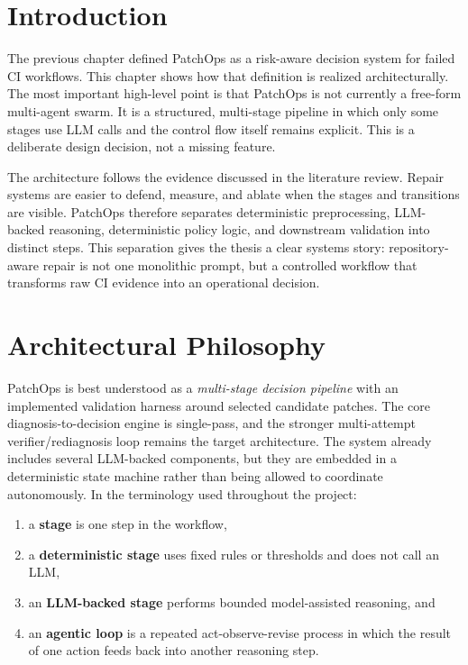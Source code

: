 \section{Introduction}

The previous chapter defined PatchOps as a risk-aware decision system for failed CI workflows. This chapter
shows how that definition is realized architecturally. The most important high-level point is that PatchOps is
not currently a free-form multi-agent swarm. It is a structured, multi-stage pipeline in which only some stages
use LLM calls and the control flow itself remains explicit. This is a deliberate design decision, not a missing
feature.

The architecture follows the evidence discussed in the literature review. Repair systems are easier to defend,
measure, and ablate when the stages and transitions are visible. PatchOps therefore separates deterministic
preprocessing, LLM-backed reasoning, deterministic policy logic, and downstream validation into distinct steps.
This separation gives the thesis a clear systems story: repository-aware repair is not one monolithic prompt,
but a controlled workflow that transforms raw CI evidence into an operational decision.

\section{Architectural Philosophy}

PatchOps is best understood as a \emph{multi-stage decision pipeline} with an implemented validation harness
around selected candidate patches. The core diagnosis-to-decision engine is single-pass, and the stronger
multi-attempt verifier/rediagnosis loop remains the target architecture. The system already includes several
LLM-backed components, but they are embedded in a deterministic state machine rather than being allowed to
coordinate autonomously. In the terminology used throughout the project:

\begin{enumerate}
\item a \textbf{stage} is one step in the workflow,
\item a \textbf{deterministic stage} uses fixed rules or thresholds and does not call an LLM,
\item an \textbf{LLM-backed stage} performs bounded model-assisted reasoning, and
\item an \textbf{agentic loop} is a repeated act-observe-revise process in which the result of one action feeds
back into another reasoning step.
\end{enumerate}

